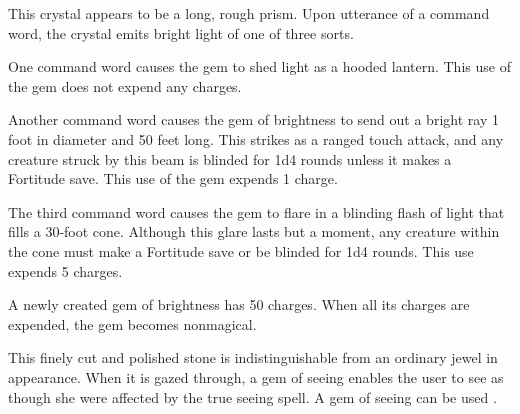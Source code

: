 {

 This crystal appears to be a long, rough prism. Upon utterance of a command word, the crystal emits bright light of one of three sorts.
\begin{itemize*}
\item One command word causes the gem to shed light as a hooded lantern. This use of the gem does not expend any charges.
\item Another command word causes the gem of brightness to send out a bright ray 1 foot in diameter and 50 feet long. This strikes as a ranged touch attack, and any creature struck by this beam is blinded for 1d4 rounds unless it makes a Fortitude save. This use of the gem expends 1 charge.
\item The third command word causes the gem to flare in a blinding flash of light that fills a 30-foot cone. Although this glare lasts but a moment, any creature within the cone must make a Fortitude save or be blinded for 1d4 rounds. This use expends 5 charges.
\end{itemize*}

A newly created gem of brightness has 50 charges. When all its charges are expended, the gem becomes nonmagical.


 This finely cut and polished stone is indistinguishable from an ordinary jewel in appearance. When it is gazed through, a gem of seeing enables the user to see as though she were affected by the true seeing spell. A gem of seeing can be used .


\begin{comment}
Golem Manual} A golem manual contains information, incantations and magical power that help a character to craft a golem. The instructions therein grant a \plus5 \my{circumstance} bonus on skill checks made to craft the golem's body. Each manual also holds the prerequisite spells needed for a specific golem, effectively grants the builder use of the Craft Construct feat during the construction of the golem, and grants the character an increase to her caster level for the purpose of crafting a golem.


\end{comment}}
